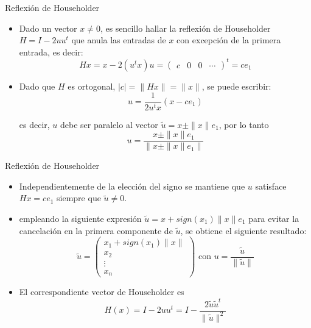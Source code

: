 \documentclass{beamer}
\begin{document}
\begin{frame}{Reflexi\'on de Householder}
  \begin{itemize}
   \item<1-> Dado un vector $x\neq 0$, es sencillo hallar la reflexi\'on de Householder $H=I-2uu^t$ que anula las entradas de $x$ con excepci\'on de la primera entrada, es decir:  
$$
Hx = x - 2(u^tx)u = \left(\begin{array}{cccc}
                           c & 0 & 0 & \cdots                           
                          \end{array}\right)^t=ce_1
$$

\item<2-> Dado que $H$ es ortogonal, $|c|=\|Hx\|=\|x\|$, se puede escribir:
$$
u = \frac{1}{2u^tx}(x-ce_1)
$$

es decir, $u$ debe ser paralelo al vector $\tilde u=x\pm\|x\|e_1$, por lo tanto
$$
\displaystyle u = \frac{x \pm \|x\|e_1}{\|x \pm \|x\|e_1\|}
$$
\end{itemize}
\end{frame}
\begin{frame}{Reflexi\'on de Householder}
  \begin{itemize}
    \item Independientemente de la elecci\'on del signo se mantiene que $u$ satisface $Hx=ce_1$ siempre que $\tilde u \neq 0$.
    \item<2-> empleando la siguiente expresi\'on $\tilde u = x + sign(x_1)\|x\|e_1$ para evitar la cancelaci\'on en la primera componente de $\tilde u$, se obtiene el siguiente resultado:
    $$
    \tilde u =\left(\begin{array}{c}
                     x_1 + sign(x_1)\|x\|\\
                     x_2\\
                     \vdots\\
                     x_n
                    \end{array}
    \right) \mbox{ con } u=\frac{\tilde u}{\|\tilde u\|}
    $$
    \item<3->El correspondiente vector de Householder es
$$
H(x) = I-2uu^t = I - \frac{2\tilde u\tilde u^t}{\|\tilde u\|^2}
$$    
  \end{itemize}
\end{frame}
\end{document}

